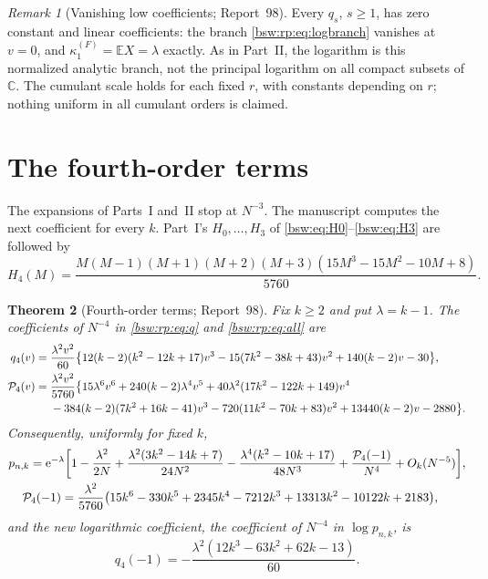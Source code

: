 \documentclass[11pt,letterpaper]{article}
\newtheorem{theorem}{Theorem}[section]
\theoremstyle{definition}
\theoremstyle{remark}
\newtheorem{remark}[theorem]{Remark}
\newcommand{\CC}{\mathbb C}
\newcommand{\EE}{\mathbb E}
\newcommand{\ee}{\mathrm e}
\begin{document}
\begin{remark}[Vanishing low coefficients; Report~98]\label{bsw:ut:rem:lowcoef}
Every $q_s$, $s\ge1$, has zero constant and linear coefficients: the branch
\eqref{bsw:rp:eq:logbranch} vanishes at $v=0$, and
$\kappa_1^{(F)}=\EE X=\lambda$ exactly.  As in Part~II, the logarithm is
this normalized analytic branch, not the principal logarithm on all compact
subsets of $\CC$.  The cumulant scale holds for each fixed $r$, with
constants depending on $r$; nothing uniform in all cumulant orders is
claimed.
\end{remark}

\section{The fourth-order terms}\label{bsw:ut:sec:fourth}

The expansions of Parts~I and~II stop at $N^{-3}$.  The manuscript computes
the next coefficient for every $k$.  Part~I's $H_0,\ldots,H_3$ of
\eqref{bsw:eq:H0}--\eqref{bsw:eq:H3} are followed by
\begin{equation}\label{bsw:ut:eq:H4}
 H_4(M)=\frac{M(M-1)(M+1)(M+2)(M+3)(15M^3-15M^2-10M+8)}{5760}.
\end{equation}

\begin{theorem}[Fourth-order terms; Report~98]\label{bsw:ut:thm:fourth}
Fix $k\ge2$ and put $\lambda=k-1$.  The coefficients of $N^{-4}$ in
\eqref{bsw:rp:eq:q} and \eqref{bsw:rp:eq:all} are
\begin{align}
 q_4(v)={}&\frac{\lambda^2v^2}{60}\bigl\{12(k-2)(k^2-12k+17)v^3
 -15(7k^2-38k+43)v^2+140(k-2)v-30\bigr\},\label{bsw:ut:eq:q4}\\
 \mathcal P_4(v)={}&\frac{\lambda^2v^2}{5760}\bigl\{15\lambda^6v^6
 +240(k-2)\lambda^4v^5+40\lambda^2(17k^2-122k+149)v^4\notag\\
 &-384(k-2)(7k^2+16k-41)v^3-720(11k^2-70k+83)v^2
 +13440(k-2)v-2880\bigr\}.\label{bsw:ut:eq:P4}
\end{align}
Consequently, uniformly for fixed $k$,
\begin{align}
 p_{n,k}=\ee^{-\lambda}\biggl[1
 &-\frac{\lambda^2}{2N}
 +\frac{\lambda^2(3k^2-14k+7)}{24N^2}
 -\frac{\lambda^4(k^2-10k+17)}{48N^3}
 +\frac{\mathcal P_4(-1)}{N^4}+O_k(N^{-5})\biggr],\label{bsw:ut:eq:p4}\\
 \mathcal P_4(-1)={}&\frac{\lambda^2}{5760}\bigl(15k^6-330k^5+2345k^4
 -7212k^3+13313k^2-10122k+2183\bigr),\notag
\end{align}
and the new logarithmic coefficient, the coefficient of $N^{-4}$ in
$\log p_{n,k}$, is
\begin{equation}\label{bsw:ut:eq:q4minus}
 q_4(-1)=-\frac{\lambda^2(12k^3-63k^2+62k-13)}{60}.
\end{equation}
\end{theorem}
\end{document}

